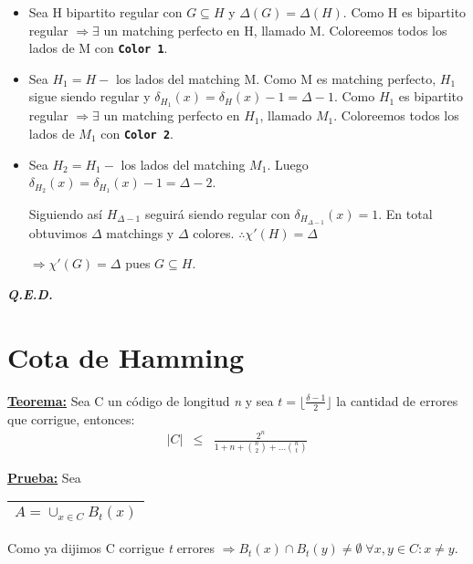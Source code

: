 \documentclass[12pt,a4paper]{report}
\newcounter{neq}
\newcommand{\QED}{\hfill \textit{\textbf{Q.E.D.}}}
\begin{document}
			\vspace{5mm}
			\begin{itemize}
				\item Sea H bipartito regular con $G \subseteq H$ y $\Delta(G) = \Delta(H)$. Como H es bipartito regular $\Rightarrow \exists$ un matching perfecto en H, llamado M. Coloreemos todos los lados de M con \textbf{\texttt{Color 1}}.
				\item Sea $H_{1} = H - $ los lados del matching M. Como M es matching perfecto, $H_{1}$ sigue siendo regular y $\delta_{H_{1}}(x) = \delta_{H}(x) - 1 = \Delta - 1$. Como $H_{1}$ es bipartito regular $\Rightarrow \exists$ un matching perfecto en $H_{1}$, llamado $M_{1}$. Coloreemos todos los lados de $M_{1}$ con \textbf{\texttt{Color 2}}.
				\item Sea $H_{2} = H_{1} - $ los lados del matching $M_{1}$. Luego $\delta_{H_{2}}(x) = \delta_{H_{1}}(x) - 1 = \Delta - 2$.
					\par Siguiendo así $H_{\Delta - 1}$ seguirá siendo regular con $ \delta_{H_{\Delta - 1}}(x) = 1$. En total obtuvimos $ \Delta $ matchings y $ \Delta $ colores. $\therefore \chi '(H) = \Delta$
					\begin{center}
						$\Rightarrow \chi ' (G) = \Delta$ pues $G \subseteq H$.
					\end{center}
			\end{itemize}

		\QED

	\section{Cota de Hamming}
		\textbf{\underline{Teorema:}} Sea C un código de longitud \textit{n} y sea $ t = \lfloor \frac{\delta - 1}{2} \rfloor$ la cantidad de errores que corrigue, entonces:
			\begin{eqnarray}
				\nonumber \lvert C \rvert &\leq & \frac{2^{n}}{1 + n + {n \choose 2} + \dotsc {n \choose t}}
			\end{eqnarray}

		\textbf{\underline{Prueba:}} Sea \begin{tabular}{|c|} \hline $ A = \cup_{x \in C} B_{t}(x) $ \\ \hline \end{tabular}

			\vspace{3mm}
				\par Como ya dijimos C corrigue \textit{t} errores $\Rightarrow B_{t}(x) \cap B_{t}(y) \neq \emptyset \; \forall x, y \in C : x \neq y$.
\end{document}
